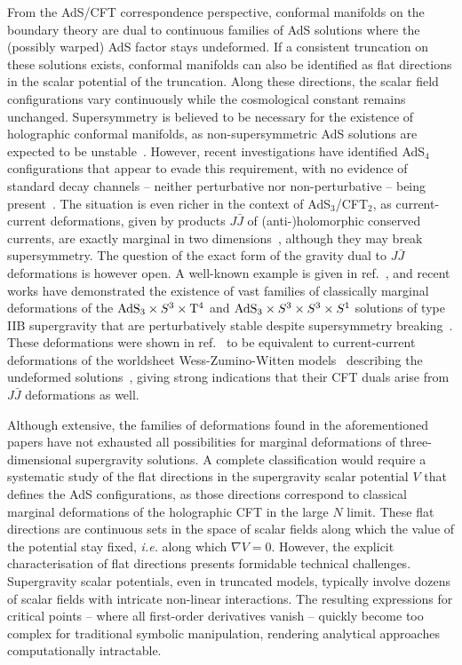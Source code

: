 \documentclass[11pt,a4paper]{article}
\begin{document}
From the AdS/CFT correspondence perspective, conformal manifolds on the boundary theory are dual to continuous families of AdS solutions where the (possibly warped) AdS factor stays undeformed. If a consistent truncation on these solutions exists, conformal manifolds can also be identified as flat directions in the scalar potential of the truncation. Along these directions, the scalar field configurations vary continuously while the cosmological constant remains unchanged. Supersymmetry is believed to be necessary for the existence of holographic conformal manifolds, as non-supersymmetric AdS solutions are expected to be unstable~\cite{Ooguri:2016pdq,Palti:2019pca}. However, recent investigations have identified AdS$_4$ configurations that appear to evade this requirement, with no evidence of standard decay channels -- neither perturbative nor non-perturbative -- being present~\cite{Giambrone:2021wsm}. The situation is even richer in the context of AdS$_3$/CFT$_2$, as current-current deformations, given by products $J\bar J$ of (anti-)holomorphic conserved currents, are exactly marginal in two dimensions~\cite{Chaudhuri:1988qb}, although they may break supersymmetry. The question of the exact form of the gravity dual to $J\bar J$ deformations is however open. A well-known example is given in ref.~\cite{Aharony:2001dp,Dong:2014tsa}, and recent works have demonstrated the existence of vast families of classically marginal deformations of the ${\rm AdS}_{3}\times S^{3}\times {\rm T}^{4}$ and ${\rm AdS}_{3}\times S^{3}\times S^{3}\times S^{1}$ solutions of type IIB supergravity that are perturbatively stable despite supersymmetry breaking~\cite{Eloy:2023zzh,Eloy:2023acy,Eloy:2024lwn}. These deformations were shown in ref.~\cite{Eloy:2024lwn} to be equivalent to current-current deformations of the worldsheet Wess-Zumino-Witten models~\cite{Gepner:1986wi} describing the undeformed solutions~\cite{Eberhardt:2017pty,Eberhardt:2018ouy}, giving strong indications that their CFT duals arise from $J\bar J$ deformations as well.

Although extensive, the families of deformations found in the aforementioned papers have not exhausted all possibilities for marginal deformations of three-dimensional supergravity solutions. A complete classification would require a systematic study of the flat directions in the supergravity scalar potential $V$ that defines the AdS configurations, as those directions correspond to classical marginal deformations of the holographic CFT in the large $N$ limit. These flat directions are continuous sets in the space of scalar fields along which the value of the potential stay fixed, \textit{i.e.}  along which $\nabla V = 0$. However, the explicit characterisation of flat directions presents formidable technical challenges. Supergravity scalar potentials, even in truncated models, typically involve dozens of scalar fields with intricate non-linear interactions. The resulting expressions for critical points -- where all first-order derivatives vanish -- quickly become too complex for traditional symbolic manipulation, rendering analytical approaches computationally intractable.
\end{document}
